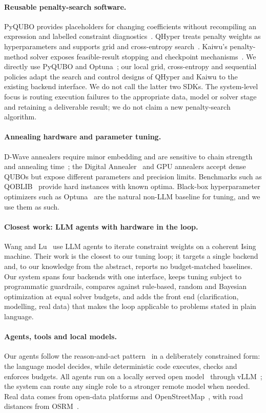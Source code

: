 \paragraph{Reusable penalty-search software.}
PyQUBO provides placeholders for changing coefficients without recompiling an expression and labelled
constraint diagnostics~\citep{pyquboDocs}. QHyper treats penalty weights as hyperparameters and supports grid
and cross-entropy search~\citep{qhyperDocs}. Kaiwu's penalty-method solver exposes feasible-result stopping
and checkpoint mechanisms~\citep{kaiwuDocs}. We directly use PyQUBO and Optuna~\citep{akiba2019optuna}; our
local grid, cross-entropy and sequential policies adapt the search and control designs of QHyper and Kaiwu
to the existing backend interface. We do not call the latter two SDKs. The system-level focus is routing
execution failures to the appropriate data, model or solver stage and retaining a deliverable result; we do
not claim a new penalty-search algorithm.

\paragraph{Annealing hardware and parameter tuning.}
D-Wave annealers require minor embedding and are sensitive to chain strength and annealing
time~\citep{pelofske2025comparing}; the Digital Annealer~\citep{aramon2019digital} and GPU annealers accept dense
QUBOs but expose different parameters and precision limits. Benchmarks such as QOBLIB~\citep{koch2025qoblib}
provide hard instances with known optima. Black-box hyperparameter optimizers such as
Optuna~\citep{akiba2019optuna} are the natural non-LLM baseline for tuning, and we use them as such.

\paragraph{Closest work: LLM agents with hardware in the loop.}
Wang and Lu~\citep{wang2026cim} use LLM agents to iterate constraint weights on a coherent Ising machine. Their
work is the closest to our tuning loop; it targets a single backend and, to our knowledge from the abstract,
reports no budget-matched baselines. Our system spans four backends with one interface, keeps tuning
subject to programmatic guardrails, compares against rule-based, random and Bayesian
optimization at equal solver budgets, and adds the front end (clarification, modelling, real data) that makes the
loop applicable to problems stated in plain language.

\paragraph{Agents, tools and local models.}
Our agents follow the reason-and-act pattern~\citep{yao2023react} in a deliberately constrained form: the language
model decides, while deterministic code executes, checks and enforces budgets. All agents run on a locally served
open model~\citep{qwen3report2025} through vLLM~\citep{kwon2023vllm}; the system can route any single role to a
stronger remote model when needed. Real data comes from open-data platforms and
OpenStreetMap~\citep{osm}, with road distances from OSRM~\citep{luxen2011osrm}.
